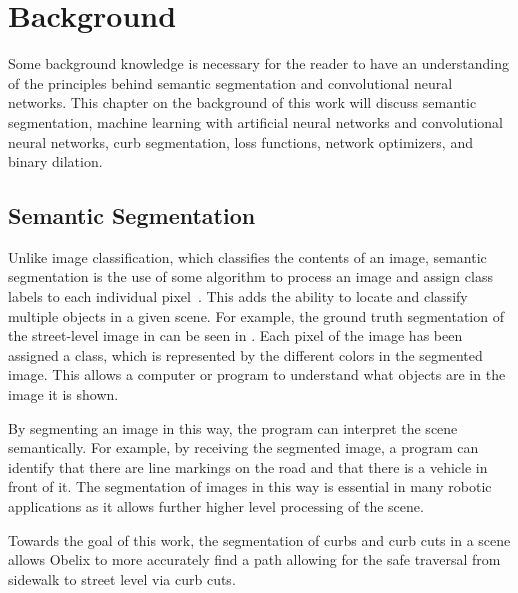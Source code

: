 \chapter{Background}\label{chap:background}
Some background knowledge is necessary for the reader to have an understanding of the principles behind semantic segmentation and convolutional neural networks.
This chapter on the background of this work will discuss semantic segmentation, machine learning with artificial neural networks and convolutional neural networks, curb segmentation, loss functions, network optimizers, and binary dilation.

\section{Semantic Segmentation}\label{section:background-segmentation}
Unlike image classification, which classifies the contents of an image, semantic segmentation is the use of some algorithm to process an image and assign class labels to each individual pixel~\cite{segmentation-medium}.
This adds the ability to locate and classify multiple objects in a given scene.
For example, the ground truth segmentation of the street-level image in  can be seen in .
Each pixel of the image has been assigned a class, which is represented by the different colors in the segmented image.
This allows a computer or program to understand what objects are in the image it is shown.



By segmenting an image in this way, the program can interpret the scene semantically.
For example, by receiving the segmented image, a program can identify that there are line markings on the road and that there is a vehicle in front of it.
The segmentation of images in this way is essential in many robotic applications as it allows further higher level processing of the scene.

Towards the goal of this work, the segmentation of curbs and curb cuts in a scene allows Obelix to more accurately find a path allowing for the safe traversal from sidewalk to street level via curb cuts.



